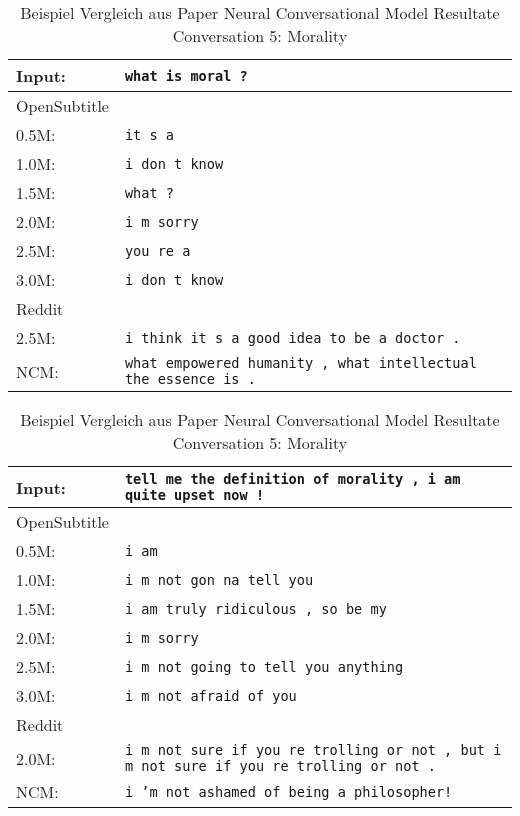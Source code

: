 \begin{table}[H]
	\centering
	\begin{adjustbox}{max width=\textwidth}
		\begin{tabular}{ll}
			\toprule
			Input: 	& \texttt{what is moral ?}\\
			\midrule
			OpenSubtitle\\
			0.5M: 	& \texttt{it s a}\\
			1.0M: 	& \texttt{i don t know}\\
			1.5M:	& \texttt{what ?}\\
			2.0M:	& \texttt{i m sorry}\\
			2.5M:	& \texttt{you re a}\\
			3.0M:	& \texttt{i don t know}\\
			\midrule
			Reddit\\
			2.5M:	& \texttt{i think it s a good idea to be a doctor .}\\
			\midrule
			NCM:	& \texttt{what empowered humanity , what intellectual the essence is .}\\
			\bottomrule
		\end{tabular}
	\end{adjustbox}
	\caption{Beispiel Vergleich aus Paper Neural Conversational Model Resultate Conversation 5: Morality}
	\label{results:example18_output: Neural_Conversational_Model_compared}
\end{table}

\begin{table}[H]
	\centering
	\begin{adjustbox}{max width=\textwidth}
		\begin{tabular}{ll}
			\toprule
			Input: 	& \texttt{tell me the definition of morality , i am quite upset now !}\\
			\midrule
			OpenSubtitle\\
			0.5M: 	& \texttt{i am}\\
			1.0M: 	& \texttt{i m not gon na tell you}\\
			1.5M:	& \texttt{i am truly ridiculous , so be my}\\
			2.0M:	& \texttt{i m sorry}\\
			2.5M:	& \texttt{i m not going to tell you anything}\\
			3.0M:	& \texttt{i m not afraid of you}\\
			\midrule
			Reddit\\
			2.0M:	& \texttt{i m not sure if you re trolling or not , but i m not sure if you re trolling or not .}\\
			\midrule
			NCM:	& \texttt{i ’m not ashamed of being a philosopher!}\\
			\bottomrule
		\end{tabular}
	\end{adjustbox}
	\caption{Beispiel Vergleich aus Paper Neural Conversational Model Resultate Conversation 5: Morality}
	\label{results:example19_output: Neural_Conversational_Model_compared}
\end{table}